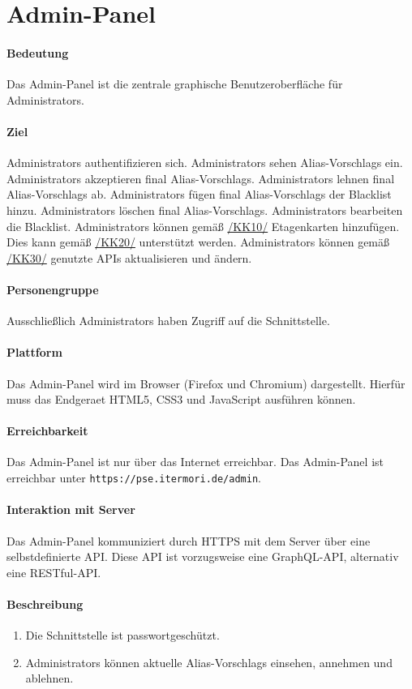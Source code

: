 \newpage
\section{Admin-Panel}
\label{Admin-Panel}

\paragraph{Bedeutung}
Das \Gls{Admin-Panel} ist die zentrale graphische Benutzeroberfläche für \Glspl{Administrator}.

\paragraph{Ziel}
\Glspl{Administrator} authentifizieren sich.
\Glspl{Administrator} sehen \Glspl{Alias-Vorschlag} ein.
\Glspl{Administrator} akzeptieren final \Glspl{Alias-Vorschlag}.
\Glspl{Administrator} lehnen final \Glspl{Alias-Vorschlag} ab.
\Glspl{Administrator} fügen final \Glspl{Alias-Vorschlag} der \Gls{Blacklist} hinzu.
\Glspl{Administrator} löschen final \Glspl{Alias-Vorschlag}.
\Glspl{Administrator} bearbeiten die \Gls{Blacklist}.
\Glspl{Administrator} können gemäß \hyperref[/KK10/]{/KK10/} Etagenkarten hinzufügen. Dies kann gemäß \hyperref[/KK20/]{/KK20/} unterstützt werden.
\Glspl{Administrator} können gemäß \hyperref[/KK30/]{/KK30/} genutzte \Gls{API}s aktualisieren und ändern.

\paragraph{Personengruppe}
Ausschließlich \Glspl{Administrator} haben Zugriff auf die \Gls{Schnittstelle}.

\paragraph{Plattform}
Das \Gls{Admin-Panel} wird im \Gls{Browser} (\Gls{Firefox} und \Gls{Chromium}) dargestellt.
Hierfür muss das \Gls{Endgeraet} \Gls{HTML5}, \Gls{CSS3} und \Gls{JavaScript} ausführen können.

\paragraph{Erreichbarkeit}
Das \Gls{Admin-Panel} ist nur über das Internet erreichbar. 
Das \Gls{Admin-Panel} ist erreichbar unter \texttt{https://pse.itermori.de/admin}.

\paragraph{Interaktion mit Server}
Das \Gls{Admin-Panel} kommuniziert durch \Gls{HTTPS} mit dem \Gls{Server} über eine selbstdefinierte \Gls{API}.
Diese \Gls{API} ist vorzugsweise eine \Gls{GraphQL}-\Gls{API}, alternativ eine \Gls{REST}ful-\Gls{API}.

\paragraph{Beschreibung}
\begin{enumerate}
    \item Die \Gls{Schnittstelle} ist passwortgeschützt.
    \item \Glspl{Administrator} können aktuelle \Glspl{Alias-Vorschlag} einsehen, annehmen und ablehnen.
\end{enumerate}